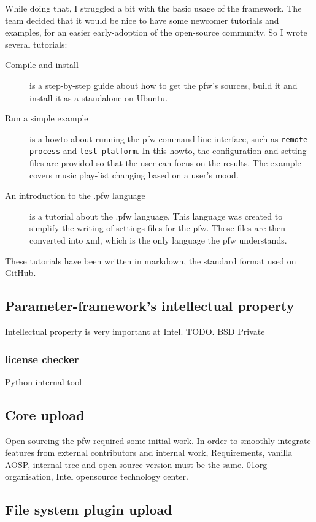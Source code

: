 While doing that, I struggled a bit with the basic usage of the framework. The
team decided that it would be nice to have some newcomer tutorials and examples,
for an easier early-adoption of the open-source community. So I wrote several
tutorials:
\begin{description}
    \item[Compile and install]
        is a step-by-step guide about how to get the \gls{pfw}'s sources,
        build it and install it as a standalone on Ubuntu.
    \item[Run a simple example]
        is a howto about running the \gls{pfw} command-line interface,
        such as \lstinline{remote-process} and \lstinline {test-platform}.  In
        this howto, the configuration and setting files are provided so that
        the user can focus on the results. The example covers music play-list
        changing based on a user's mood.
    \item[An introduction to the .pfw language]\label{desc:pfw-language}
        is a tutorial about the .pfw language. This language was
        created to simplify the writing of settings files for the
        \gls{pfw}. Those files are then converted into \gls{xml}, which is
        the only language the \gls{pfw} understands.
\end{description}
These tutorials have been written in \gls{markdown}, the standard format used
on GitHub.


\subsection{Parameter-framework's intellectual property}
Intellectual property is very important at Intel. TODO.
BSD
Private
\subsubsection{license checker}
Python internal tool

\subsection{Core upload}
Open-sourcing the \gls{pfw} required some initial work.
In order to smoothly integrate features from external contributors and internal work,
Requirements, vanilla AOSP, internal tree and open-source version must be the
same.
01org organisation, Intel opensource technology center.


\subsection{File system plugin upload}

